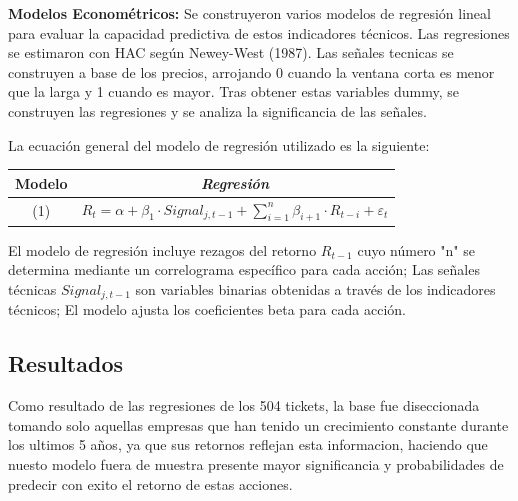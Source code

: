 \documentclass[a0,portrait]{a0poster}
\newcommand{\customsection}[1]{
    \begin{center}
        \begin{tcolorbox}[colframe=miRojo!50, colback=miRojo, width=\linewidth, boxrule=1mm, arc=3mm, auto outer arc]
            \centering
            \vspace{.5cm} %
            \color{white}
            \section*{ \textbf{\Huge #1}}  %
            \vspace{.2cm} %
        \end{tcolorbox}
    \end{center}
}
\begin{document}
\begin{multicols}{2}
\begin{minipage}{.984\linewidth}
    \end{minipage}
    \par
    \textbf{Modelos Econométricos:} Se construyeron varios modelos de regresión lineal para evaluar la capacidad predictiva de 
    estos indicadores técnicos. Las regresiones se estimaron con HAC según Newey-West (1987). Las señales tecnicas se construyen 
    a base de los precios, arrojando 0 cuando la ventana corta es menor que la larga y 1 cuando es mayor. Tras obtener estas 
    variables dummy, se construyen las regresiones y se analiza la significancia de 
    las señales. 
    
    La ecuación general del modelo de regresión utilizado es la siguiente:

\begin{minipage}{.984\linewidth}
    \centering
    \vspace{1cm}
    \begin{tabular}{cl}
        \toprule

        \textbf{Modelo} & \multicolumn{1}{c}{\textbf{\textit{Regresión}}}   \\
        \midrule
        (1) & $R_t = \alpha + \beta_1 \cdot Signal_{j,t-1} + \sum_{i=1}^{n}  \beta_{i+1} \cdot R_{t-i} +\varepsilon_t$ \\
        \bottomrule
    \end{tabular}
    \vspace{.3cm}
    \captionsetup{width=0.8\textwidth}  %
    \caption*{\footnotesize El modelo de regresión incluye rezagos del retorno \( R_{t-1}\)
    cuyo número "n" se determina mediante un correlograma específico para cada acción; Las señales técnicas \(Signal_{j,t-1}\) 
    son variables binarias obtenidas a través de los indicadores técnicos; El modelo ajusta los coeficientes beta para cada acción.    }  %
    \vspace{.5cm}
    \end{minipage}
       
                
                
    \customsection{Resultados}
    \par 
     \normalsize
    Como resultado de las regresiones de los 504 tickets, la base fue diseccionada tomando solo aquellas empresas 
    que han tenido un crecimiento constante durante los ultimos 5 años, ya que sus retornos reflejan esta informacion, 
    haciendo que nuesto modelo fuera de muestra presente mayor significancia y probabilidades de predecir con exito el 
    retorno de estas acciones.
    


\end{multicols}
\end{document}
